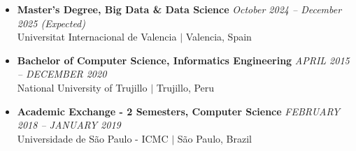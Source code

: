 \begin{itemize}[leftmargin=*, label={}, itemsep=0.1in]

    \item
    \textbf{Master’s Degree, Big Data \& Data Science} \hfill \textit{October 2024 – December 2025 (Expected)} \\
    Universitat Internacional de Valencia $|$ Valencia, Spain

    \item
    \textbf{Bachelor of Computer Science, Informatics Engineering} \hfill \textit{APRIL 2015 – DECEMBER 2020} \\
    National University of Trujillo $|$ Trujillo, Peru

    \item
    \textbf{Academic Exchange - 2 Semesters, Computer Science} \hfill \textit{FEBRUARY 2018 – JANUARY 2019} \\
    Universidade de São Paulo - ICMC $|$ São Paulo, Brazil

\end{itemize}